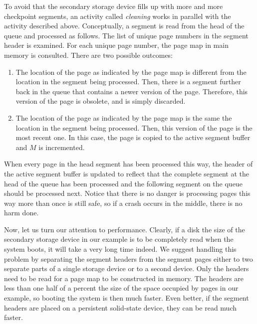 To avoid that the secondary storage device fills up with more and more
checkpoint segments, an activity called \emph{cleaning} works in
parallel with the activity described above.  Conceptually, a segment
is read from the head of the queue and processed as follows.  The
list of unique page numbers in the segment header is examined.  For
each unique page number, the page map in main memory is consulted.
There are two possible outcomes:

\begin{enumerate}
\item The location of the page as indicated by the page map is
  different from the location in the segment being processed.  Then,
  there is a segment further back in the queue that contains a newer
  version of the page.  Therefore, this version of the page is
  obsolete, and is simply discarded.
\item The location of the page as indicated by the page map is the
  same the location in the segment being processed.  Then, this
  version of the page is the most recent one.  In this case, the page
  is copied to the active segment buffer and $M$ is incremented.
\end{enumerate}

When every page in the head segment has been processed this way, the
header of the active segment buffer is updated to reflect that the
complete segment at the head of the queue has been processed and the
following segment on the queue should be processed next.  Notice that
there is no danger is processing pages this way more than once is
still safe, so if a crash occurs in the middle, there is no harm
done.

Now, let us turn our attention to performance.  Clearly, if a disk the
size of the secondary storage device in our example is to be
completely read when the system boots, it will take a very long time
indeed.  We suggest handling this problem by separating the segment
headers from the segment pages either to two separate parts of a
single storage device or to a second device.  Only the headers need to
be read for a page map to be constructed in memory.  The headers are
less than one half of a percent the size of the space occupied by
pages in our example, so booting the system is then much faster.  Even
better, if the segment headers are placed on a persistent solid-state
device, they can be read much faster.
